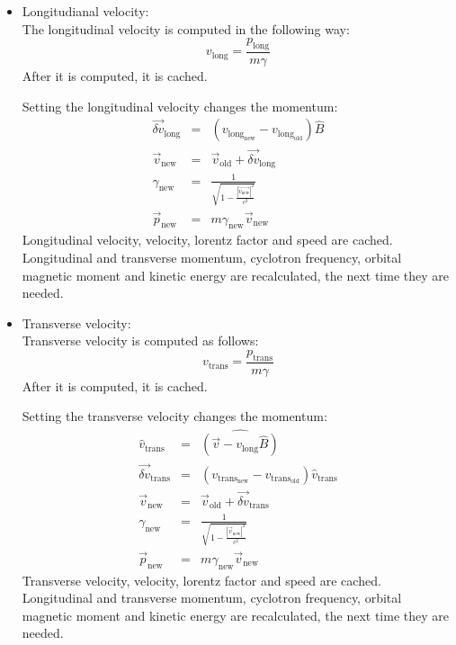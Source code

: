 \begin{itemize}
		\item Longitudianal velocity:\\
		The longitudinal velocity is computed in the following way:
		\begin{equation}
			v_{\mathrm{long}} = \frac{p_{\mathrm{long}}}{m\gamma}
		\end{equation}
		After it is computed, it is cached.    
		
		Setting the longitudinal velocity changes the momentum:
		\begin{eqnarray}
			\vec{\delta v}_{\mathrm{long}} &=& \left( v_{\mathrm{long}_{\mathrm{new}}} - v_{\mathrm{long}_{\mathrm{old}}}\right) \hat{B} \\
			\vec{v}_{\mathrm{new}} &=&  \vec{v}_{\mathrm{old}} + \vec{\delta v}_{\mathrm{long}}\\
			\gamma_{\mathrm{new}} &=& \frac{1}{\sqrt{1-\frac{| \vec{v_{\mathrm{new}}} |^2}{c^2}}}\\
			\vec{p}_{\mathrm{new}} &=& m \gamma_{\mathrm{new}} \vec{v}_{\mathrm{new}}   
		\end{eqnarray}    
		Longitudinal velocity, velocity, lorentz factor and speed are cached. Longitudinal and transverse momentum, cyclotron frequency, orbital magnetic moment and kinetic energy are recalculated, the next time they are needed.

		\item Transverse velocity:\\
		Transverse velocity is computed as follows:
		\begin{equation}
			v_{\mathrm{trans}} = \frac{p_{\mathrm{trans}}}{m \gamma}
		\end{equation}
		After it is computed, it is cached.  

		Setting the transverse velocity changes the momentum:
		\begin{eqnarray}
			\hat{v}_{\mathrm{trans}} &=& \widehat{\left(\vec{v} - v_{\mathrm{long}} \hat{B} \right)} \\
			\vec{\delta v}_{\mathrm{trans}} &=& \left( v_{\mathrm{trans}_{\mathrm{new}}} - v_{\mathrm{trans}_{\mathrm{old}}} \right) \hat{v}_{\mathrm{trans}}   \\
			\vec{v}_{\mathrm{new}} &=& \vec{v}_{\mathrm{old}} + \vec{\delta v}_{\mathrm{trans}}\\
			\gamma_{\mathrm{new}} &=& \frac{1}{\sqrt{1-\frac{|\vec{v}_{\mathrm{new}}|^2}{c^2}}}\\
			\vec{p}_{\mathrm{new}} &=& m \gamma_{\mathrm{new}} \vec{v}_{\mathrm{new}}   
		\end{eqnarray}       
		Transverse velocity, velocity, lorentz factor and speed are cached. Longitudinal and transverse momentum, cyclotron frequency, orbital magnetic moment and kinetic energy are recalculated, the next time they are needed.
    

\end{itemize}
